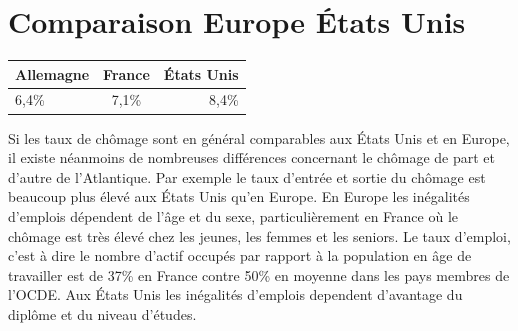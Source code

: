 \documentclass[main.tex]{subfiles}
\begin{document}
        \section{Comparaison Europe États Unis}
\begin{center}
        \begin{tabular}{ |l|c|r|}
                \hline
                Allemagne & France & États Unis \\
                \hline
                6,4\% & 7,1\% & 8,4\% \\
                \hline
        \end{tabular}
\end{center}
        \medskip
        Si les taux de chômage sont en général comparables aux États Unis et en Europe, il existe néanmoins de nombreuses différences concernant le chômage de part et d'autre de l'Atlantique. Par exemple le taux d'entrée et sortie du chômage est beaucoup plus élevé aux États Unis qu'en Europe. En Europe les inégalités d'emplois dépendent de l'âge et du sexe, particulièrement en France où le chômage est très élevé chez les jeunes, les femmes et les seniors. Le taux d'emploi, c'est à dire le nombre d'actif occupés par rapport à la population en âge de travailler est de 37\% en France contre 50\% en moyenne dans les pays membres de l'OCDE. Aux États Unis les inégalités d'emplois dependent d'avantage du diplôme et du niveau d'études.
\end{document}
